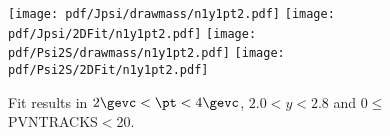 \begin{figure}[H]
\begin{center}
\texttt{[image: pdf/Jpsi/drawmass/n1y1pt2.pdf]}
\texttt{[image: pdf/Jpsi/2DFit/n1y1pt2.pdf]}
\vspace*{-0.5cm}
\texttt{[image: pdf/Psi2S/drawmass/n1y1pt2.pdf]}
\texttt{[image: pdf/Psi2S/2DFit/n1y1pt2.pdf]}
\vspace*{-0.5cm}
\end{center}
\caption{Fit results in $2\gevc<\pt<4\gevc$, $2.0<y<2.8$ and 0$\leq$PVNTRACKS$<$20.}
\label{Fitn1y1pt2}
\end{figure}

